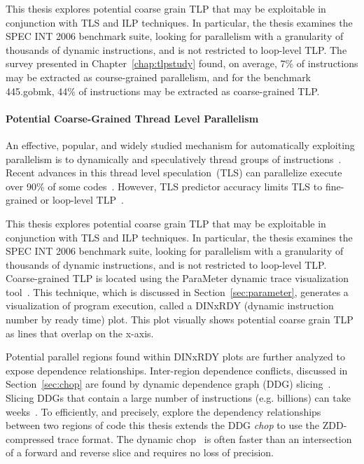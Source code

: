 {This thesis explores potential coarse grain TLP that may be exploitable in conjunction with TLS and ILP techniques.  In particular, the thesis examines the SPEC INT 2006 benchmark suite, looking for parallelism with a granularity of thousands of dynamic instructions, and is not restricted to loop-level TLP. The survey presented in Chapter~\ref{chap:tlpstudy} found, on average, 7\% of instructions may be extracted as course-grained parallelism, and for the benchmark 445.gobmk, 44\% of instructions may be extracted as coarse-grained TLP.

\noindent\paragraph{Potential Coarse-Grained Thread Level Parallelism}

An effective, popular, and widely studied mechanism for automatically exploiting parallelism is to dynamically and speculatively thread groups of instructions~\cite{steffan:00:isca,prabhu:03:ppopp,wu:2008:cdp,chen:cc:2004,vachharajani:07:pact,dou:2007:trans,wang:2009:dps,marcuello:00:ipdps,bridges:2007:micro,thies:2007:micro,raman:2010:asplos}. Recent advances in this thread level speculation~(TLS) can parallelize execute over 90\% of some codes~\cite{marcuello:00:ipdps}.  However, TLS predictor accuracy limits TLS to fine-grained or loop-level TLP~\cite{marcuello:00:ipdps,warg:2001:pact,bridges:2007:micro,thies:2007:micro,raman:2010:asplos}.

This thesis explores potential coarse grain TLP that may be exploitable in conjunction with TLS and ILP techniques.  In particular, the thesis examines the SPEC INT 2006 benchmark suite, looking for parallelism with a granularity of thousands of dynamic instructions, and is not restricted to loop-level TLP.  Coarse-grained TLP is located using the ParaMeter dynamic trace visualization tool~\cite{price:08:pact}.  This technique, which is discussed in Section~\ref{sec:parameter}, generates a visualization of program execution, called a DINxRDY (dynamic instruction number by ready time) plot.  This plot visually shows potential coarse grain TLP as lines that overlap on the x-axis.

Potential parallel regions found within DINxRDY plots are further analyzed to expose dependence relationships.  Inter-region dependence conflicts, discussed in Section~\ref{sec:chop} are found by dynamic dependence graph (DDG) slicing~\cite{gallager:91:se,agrawal:90:pldi,agrawal:92:thesis,korel:88:ipl}. Slicing DDGs that contain a large number of instructions (e.g. billions) can take weeks~\cite{agrawal:90:pldi, zhang:03:icse}. To efficiently, and precisely, explore the dependency relationships between two regions of code this thesis extends the DDG \textit{chop} to use the ZDD-compressed trace format.  The dynamic chop~\cite{gupta:2005:ase, krinke:2004:sqc} is often faster than an intersection of a forward and reverse slice and requires no loss of precision.

}
